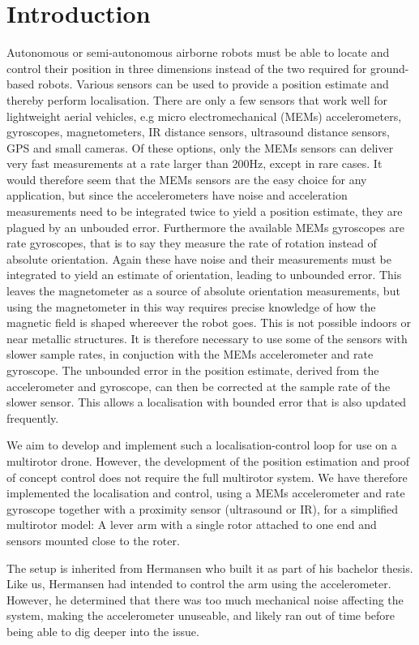 \section{Introduction}
Autonomous or semi-autonomous airborne robots must be able to locate and control their position in three dimensions instead of
the two required for ground-based robots. Various sensors can be used to provide a position estimate and thereby perform localisation.
There are only a few sensors that work well for lightweight aerial vehicles, e.g micro electromechanical (MEMs) accelerometers, 
gyroscopes, magnetometers, IR distance sensors, ultrasound distance sensors, GPS and small cameras. Of these options, only the MEMs
sensors can deliver very fast measurements at a rate larger than 200Hz, except in rare cases. It would therefore seem that the MEMs
sensors are the easy choice for any application, but since the accelerometers have noise and acceleration measurements need to be 
integrated twice to yield a position estimate, they are plagued by an unbouded error. Furthermore the available MEMs gyroscopes are rate 
gyroscopes, that is to say they measure the rate of rotation instead of absolute orientation. Again these have noise and their measurements
must be integrated to yield an estimate of orientation, leading to unbounded error. This leaves the magnetometer as a source of
absolute orientation measurements, but using the magnetometer in this way requires precise knowledge of how the magnetic field is 
shaped whereever the robot goes. This is not possible indoors or near metallic structures.
It is therefore necessary to use some of the sensors with slower sample rates, in conjuction with
the MEMs accelerometer and rate gyroscope. The unbounded error in the position estimate, derived from the accelerometer and gyroscope,
can then be corrected at the sample rate of the slower sensor. This allows a localisation with bounded error that is also updated
frequently. 

We aim to develop and implement such a localisation-control loop for use on a multirotor drone. However, the development of the position 
estimation and proof of concept control does not require the full multirotor system. We have therefore implemented the localisation 
and control, using a MEMs accelerometer and rate gyroscope together with a proximity sensor (ultrasound or IR), for a simplified multirotor model: 
A lever arm with a single rotor attached to one end and sensors mounted close to the roter.

The setup is inherited from Hermansen who built it as part of his bachelor thesis\cite{Hermansen2013a}.
Like us, Hermansen had intended to control the arm using the accelerometer. However, he determined that there was too much mechanical 
noise affecting the system, making the accelerometer unuseable, and likely ran out of time before being able to dig deeper into the 
issue.

